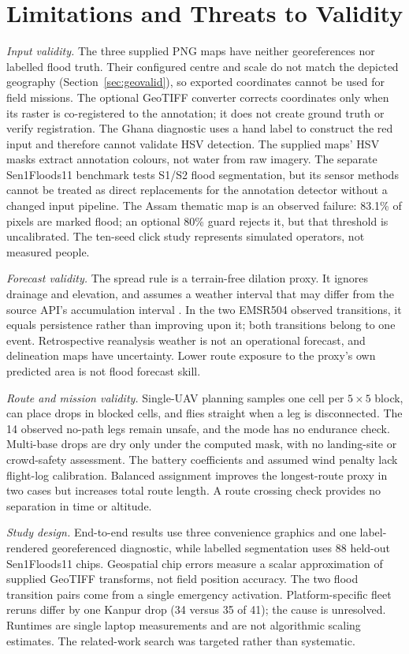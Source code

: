 \section{Limitations and Threats to Validity}
\label{sec:limits}
\emph{Input validity.} The three supplied PNG maps have neither georeferences nor labelled flood truth. Their configured centre and scale do not match the depicted geography (Section~\ref{sec:geovalid}), so exported coordinates cannot be used for field missions. The optional GeoTIFF converter corrects coordinates only when its raster is co-registered to the annotation; it does not create ground truth or verify registration. The Ghana diagnostic uses a hand label to construct the red input and therefore cannot validate HSV detection. The supplied maps' HSV masks extract annotation colours, not water from raw imagery. The separate Sen1Floods11 benchmark tests S1/S2 flood segmentation, but its sensor methods cannot be treated as direct replacements for the annotation detector without a changed input pipeline. The Assam thematic map is an observed failure: 83.1\% of pixels are marked flood; an optional 80\% guard rejects it, but that threshold is uncalibrated. The ten-seed click study represents simulated operators, not measured people.

\emph{Forecast validity.} The spread rule is a terrain-free dilation proxy. It ignores drainage and elevation, and assumes a weather interval that may differ from the source API's accumulation interval \cite{openmeteo_docs}. In the two EMSR504 observed transitions, it equals persistence rather than improving upon it; both transitions belong to one event. Retrospective reanalysis weather is not an operational forecast, and delineation maps have uncertainty. Lower route exposure to the proxy's own predicted area is not flood forecast skill.

\emph{Route and mission validity.} Single-UAV planning samples one cell per $5\times5$ block, can place drops in blocked cells, and flies straight when a leg is disconnected. The 14 observed no-path legs remain unsafe, and the mode has no endurance check. Multi-base drops are dry only under the computed mask, with no landing-site or crowd-safety assessment. The battery coefficients and assumed wind penalty lack flight-log calibration. Balanced assignment improves the longest-route proxy in two cases but increases total route length. A route crossing check provides no separation in time or altitude.

\emph{Study design.} End-to-end results use three convenience graphics and one label-rendered georeferenced diagnostic, while labelled segmentation uses 88 held-out Sen1Floods11 chips. Geospatial chip errors measure a scalar approximation of supplied GeoTIFF transforms, not field position accuracy. The two flood transition pairs come from a single emergency activation. Platform-specific fleet reruns differ by one Kanpur drop (34 versus 35 of 41); the cause is unresolved. Runtimes are single laptop measurements and are not algorithmic scaling estimates. The related-work search was targeted rather than systematic.

